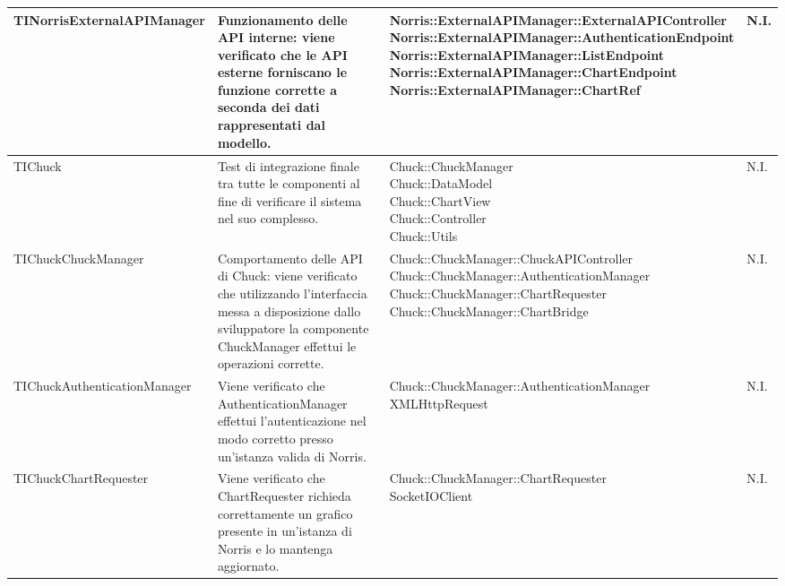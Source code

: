 \begin{table}[H]
\begin{center}
\begin{longtabu}{| p{0.30\textwidth} |p{0.24\textwidth} |p{0.35\textwidth} | p{0.05\textwidth} |}
	TINorrisExternalAPIManager
	&
Funzionamento delle API interne: viene verificato che le API esterne forniscano le funzione corrette a seconda dei dati rappresentati dal modello.
& \parbox[t]{0.6\textwidth}{
Norris::ExternalAPIManager::ExternalAPIController\\
Norris::ExternalAPIManager::AuthenticationEndpoint\\
Norris::ExternalAPIManager::ListEndpoint\\
Norris::ExternalAPIManager::ChartEndpoint\\
Norris::ExternalAPIManager::ChartRef}
			& N.I.
			\\ \hline











	TIChuck
				&
Test di integrazione finale tra tutte le componenti al fine di verificare il sistema nel suo complesso.
			& \parbox[t]{0.6\textwidth}{
Chuck::ChuckManager\\
Chuck::DataModel\\
Chuck::ChartView\\
Chuck::Controller\\
Chuck::Utils}
			& N.I.
			\\ \hline



	TIChuckChuckManager
				&
Comportamento delle API di Chuck: viene verificato che utilizzando l'interfaccia messa a disposizione dallo sviluppatore la componente ChuckManager effettui le operazioni corrette.
			& \parbox[t]{0.6\textwidth}{
Chuck::ChuckManager::ChuckAPIController\\
Chuck::ChuckManager::AuthenticationManager\\
Chuck::ChuckManager::ChartRequester\\
Chuck::ChuckManager::ChartBridge}
			& N.I.
			\\ \hline


	
	TIChuckAuthenticationManager
				&
Viene verificato che AuthenticationManager effettui l'autenticazione nel modo corretto presso un'istanza valida di Norris.
			& \parbox[t]{0.6\textwidth}{
Chuck::ChuckManager::AuthenticationManager\\
XMLHttpRequest}
			& N.I.
			\\ \hline



	TIChuckChartRequester
				&
Viene verificato che ChartRequester richieda correttamente un grafico presente in un'istanza di Norris e lo mantenga aggiornato.
			& \parbox[t]{0.6\textwidth}{
Chuck::ChuckManager::ChartRequester\\
SocketIOClient}
			& N.I.
			\\ \hline




\end{longtabu}
\end{center}
\end{table}
